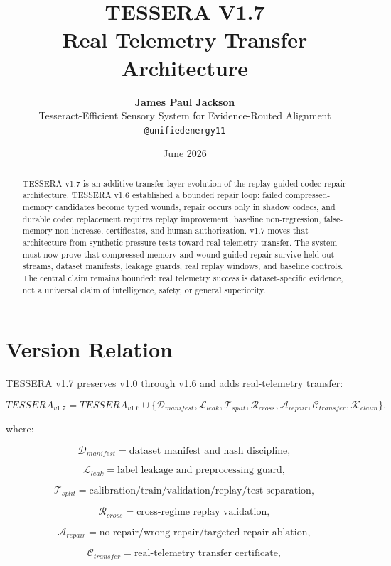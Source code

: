 \documentclass[12pt]{article}
\title{\textbf{TESSERA V1.7}\\
\large Real Telemetry Transfer Architecture}
\author{\textbf{James Paul Jackson}\\[4pt]
\small Tesseract-Efficient Sensory System for Evidence-Routed Alignment\\
\small \texttt{@unifiedenergy11}}
\date{June 2026}
\begin{document}
\maketitle

\begin{abstract}
TESSERA v1.7 is an additive transfer-layer evolution of the replay-guided codec
repair architecture. TESSERA v1.6 established a bounded repair loop: failed
compressed-memory candidates become typed wounds, repair occurs only in shadow
codecs, and durable codec replacement requires replay improvement, baseline
non-regression, false-memory non-increase, certificates, and human
authorization. v1.7 moves that architecture from synthetic pressure tests toward
real telemetry transfer. The system must now prove that compressed memory and
wound-guided repair survive held-out streams, dataset manifests, leakage guards,
real replay windows, and baseline controls. The central claim remains bounded:
real telemetry success is dataset-specific evidence, not a universal claim of
intelligence, safety, or general superiority.
\end{abstract}

\section{Version Relation}

TESSERA v1.7 preserves v1.0 through v1.6 and adds real-telemetry transfer:

\[
\boxed{
TESSERA_{v1.7}
=
TESSERA_{v1.6}
\cup
\{\mathcal{D}_{manifest},\mathcal{L}_{leak},\mathcal{T}_{split},
\mathcal{R}_{cross},\mathcal{A}_{repair},\mathcal{C}_{transfer},\mathcal{K}_{claim}\}.
}
\]

where:

\[
\mathcal{D}_{manifest}=\text{dataset manifest and hash discipline},
\]

\[
\mathcal{L}_{leak}=\text{label leakage and preprocessing guard},
\]

\[
\mathcal{T}_{split}=\text{calibration/train/validation/replay/test separation},
\]

\[
\mathcal{R}_{cross}=\text{cross-regime replay validation},
\]

\[
\mathcal{A}_{repair}=\text{no-repair/wrong-repair/targeted-repair ablation},
\]

\[
\mathcal{C}_{transfer}=\text{real-telemetry transfer certificate},
\]
\end{document}
